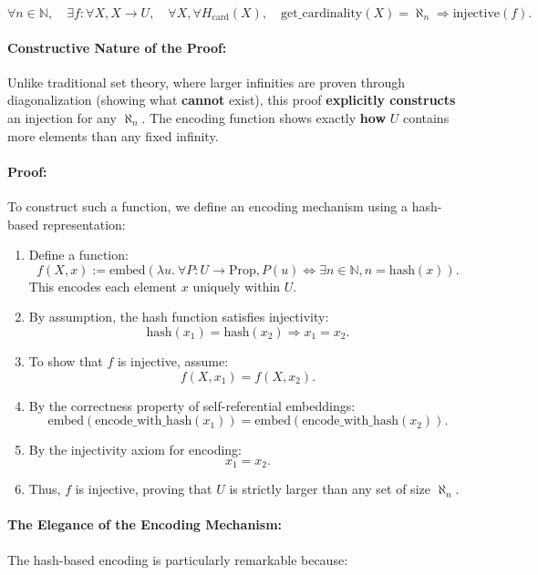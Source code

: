 \documentclass[12pt]{article}
\begin{document}
\begin{equation}
    \forall n \in \mathbb{N}, \quad
    \exists f: \forall X, X \to U, \quad
    \forall X, \forall H_{\text{card}}(X), \quad
    \text{get\_cardinality}(X) = \aleph_n \Rightarrow \text{injective}(f).
\end{equation}

\paragraph{Constructive Nature of the Proof:}
Unlike traditional set theory, where larger infinities are proven through diagonalization (showing what \textbf{cannot} exist), this proof \textbf{explicitly constructs} an injection for any \( \aleph_n \). The encoding function shows exactly \textbf{how} \( U \) contains more elements than any fixed infinity.

\paragraph{Proof:}
To construct such a function, we define an encoding mechanism using a hash-based representation:

\begin{enumerate}
    \item Define a function:
    \[
    f(X, x) := \text{embed}(\lambda u.\ \forall P: U \to \text{Prop}, P(u) \Leftrightarrow \exists n \in \mathbb{N}, n = \text{hash}(x)).
    \]
    This encodes each element \( x \) uniquely within \( U \).
    \item By assumption, the hash function satisfies injectivity:
    \[
    \text{hash}(x_1) = \text{hash}(x_2) \Rightarrow x_1 = x_2.
    \]
    \item To show that \( f \) is injective, assume:
    \[
    f(X, x_1) = f(X, x_2).
    \]
    \item By the correctness property of self-referential embeddings:
    \[
    \text{embed}(\text{encode\_with\_hash}(x_1)) = \text{embed}(\text{encode\_with\_hash}(x_2)).
    \]
    \item By the injectivity axiom for encoding:
    \[
    x_1 = x_2.
    \]
    \item Thus, \( f \) is injective, proving that \( U \) is strictly larger than any set of size \( \aleph_n \).
\end{enumerate}

\paragraph{The Elegance of the Encoding Mechanism:}
The hash-based encoding is particularly remarkable because:
\end{document}
